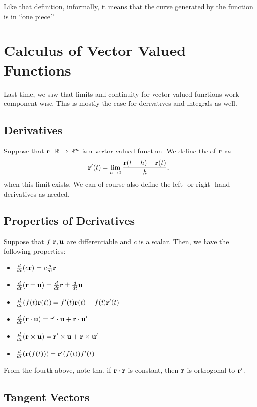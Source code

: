Like that definition, informally, it means that the curve generated by the function is in ``one piece.''

\newpage

\section{Calculus of Vector Valued Functions}

Last time, we saw that limits and continuity for vector valued functions work component-wise. This is mostly the case for derivatives and integrals as well.

\subsection{Derivatives}

Suppose that \(\mathbf{r} \colon \mathbb{R} \to \mathbb{R}^{n}\) is a vector valued function. We define the  of \(\mathbf{r}\) as 
\[
    \mathbf{r}'(t) = \lim_{h \to 0} \frac{\mathbf{r}(t + h) - \mathbf{r}(t)}{h},
\]
when this limit exists. We can of course also define the left- or right- hand derivatives as needed.

\subsection{Properties of Derivatives}

Suppose that \(f, \mathbf{r}, \mathbf{u}\) are differentiable and \(c\) is a scalar. Then, we have the following properties:

\begin{itemize}
    \item \(\frac{d}{dt}(c\mathbf{r}) = c\frac{d}{dt}\mathbf{r}\)
    \item \(\frac{d}{dt}(\mathbf{r} \pm \mathbf{u}) = \frac{d}{dt}\mathbf{r} \pm \frac{d}{dt}\mathbf{u}\)
    \item \(\frac{d}{dt}(f(t)\mathbf{r}(t)) = f'(t)\mathbf{r}(t) + f(t)\mathbf{r}'(t)\)
    \item \(\frac{d}{dt}(\mathbf{r} \cdot \mathbf{u}) = \mathbf{r}' \cdot \mathbf{u} + \mathbf{r} \cdot \mathbf{u}'\)
    \item \(\frac{d}{dt}(\mathbf{r} \times \mathbf{u}) = \mathbf{r}' \times \mathbf{u} + \mathbf{r} \times \mathbf{u}'\)
    \item \(\frac{d}{dt}(\mathbf{r}(f(t))) = \mathbf{r}'(f(t))f'(t)\)
\end{itemize}

From the fourth above, note that if \(\mathbf{r} \cdot \mathbf{r}\) is constant, then \(\mathbf{r}\) is orthogonal to \(\mathbf{r}'\).

\subsection{Tangent Vectors}

